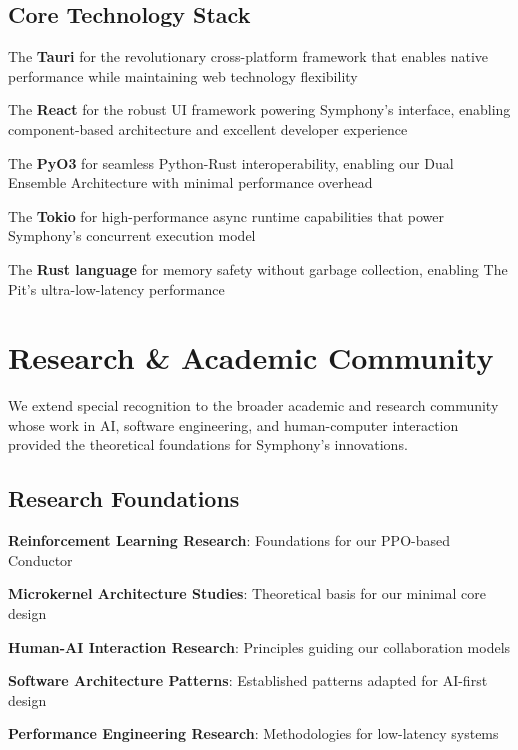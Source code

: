 \subsection*{Core Technology Stack}
\begin{expandedlist}
    \item The \textbf{Tauri} for the revolutionary cross-platform framework that enables native performance while maintaining web technology flexibility
    \item The \textbf{React} for the robust UI framework powering Symphony's interface, enabling component-based architecture and excellent developer experience
    \item The \textbf{PyO3} for seamless Python-Rust interoperability, enabling our Dual Ensemble Architecture with minimal performance overhead
    \item The \textbf{Tokio} for high-performance async runtime capabilities that power Symphony's concurrent execution model
    \item The \textbf{Rust language} for memory safety without garbage collection, enabling The Pit's ultra-low-latency performance
\end{expandedlist}

\section*{Research \& Academic Community}

\begin{successbox}
We extend special recognition to the broader academic and research community whose work in AI, software engineering, and human-computer interaction provided the theoretical foundations for Symphony's innovations.
\end{successbox}

\subsection*{Research Foundations}
\begin{compactlist}
    \item \textbf{Reinforcement Learning Research}: Foundations for our PPO-based Conductor
    \item \textbf{Microkernel Architecture Studies}: Theoretical basis for our minimal core design
    \item \textbf{Human-AI Interaction Research}: Principles guiding our collaboration models
    \item \textbf{Software Architecture Patterns}: Established patterns adapted for AI-first design
    \item \textbf{Performance Engineering Research}: Methodologies for low-latency systems
\end{compactlist}

